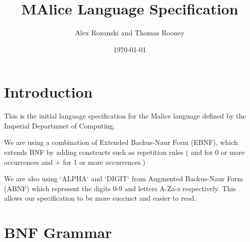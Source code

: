 \documentclass[a4wide, 11pt]{article}
\begin{document}
\title{MAlice Language Specification}

\author{Alex Rozanski and Thomas Rooney}

\date{\today}         %

\maketitle            %

\section{Introduction}

This is the initial language specification for the Malice language defined by the Imperial Departmnet of Computing. 

We are using a combination of Extended Backus-Naur Form (EBNF), which extends BNF by adding constructs such as repetition rules ({ and } for 0 or more occurrences and + for 1 or more occurrences.)

We are also using `ALPHA` and `DIGIT` from Augmented Backus-Naur Form (ABNF) which represent the digits 0-9 and letters A-Za-z respectively. This allows our specification to be more succinct and easier to read.



\section{BNF Grammar} 
\end{document}

